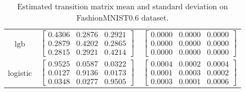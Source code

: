 \documentclass{article} %
\begin{document}
\begin{table}
\begin{tabular}{ccc}
lgb & $\begin{bmatrix}0.4306 & 0.2876 & 0.2921\\0.2879 & 0.4202 & 0.2865\\0.2815 & 0.2921 & 0.4214\end{bmatrix}$ & $\begin{bmatrix}0.0000 & 0.0000 & 0.0000\\0.0000 & 0.0000 & 0.0000\\0.0000 & 0.0000 & 0.0000\end{bmatrix}$\\
logistic & $\begin{bmatrix}0.9525 & 0.0587 & 0.0322\\0.0127 & 0.9136 & 0.0173\\0.0348 & 0.0277 & 0.9505\end{bmatrix}$ & $\begin{bmatrix}0.0004 & 0.0002 & 0.0004\\0.0001 & 0.0003 & 0.0002\\0.0003 & 0.0001 & 0.0006\end{bmatrix}$\\
\end{tabular}\caption{
  Estimated transition matrix mean and standard deviation on FashionMNIST0.6 dataset.
  \label{tab:T-FashionMNIST0.6}
}\end{table}
\end{document}
